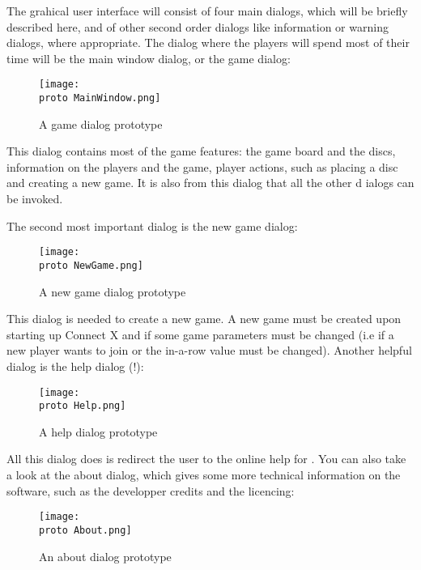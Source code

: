   The  grahical user interface will consist of four main dialogs,
  which will be briefly described here, and of other second order dialogs like
  information or warning dialogs, where appropriate. The dialog where the players
  will spend most of their time will be the main window dialog, or the game
  dialog:

  \begin{figure}[H]
    \texttt{[image: \\proto MainWindow.png]}
    \caption{A game dialog prototype}
  \end{figure}

  This dialog contains most of the game features: the game board and the discs,
  information on the players and the game, player actions, such as placing a
  disc and creating a new game. It is also from this dialog that all the other
  d ialogs can be invoked.

  The second most important dialog is the new game dialog:

  \begin{figure}[H]
    \texttt{[image: \\proto NewGame.png]}
    \caption{A new game dialog prototype}
  \end{figure}

  This dialog is needed to create a new game. A new game must be created upon
  starting up Connect X and if some game parameters must be changed (i.e if
  a new player wants to join or the in-a-row value must be changed). Another
  helpful dialog is the help dialog (!):

  \begin{figure}[H]
    \texttt{[image: \\proto Help.png]}
    \caption{A help dialog prototype}
  \end{figure}

  All this dialog does is redirect the user to the online help for .
  You can also take a look at the about dialog, which gives some more technical
  information on the software, such as the developper credits and the licencing:

  \begin{figure}[H]
    \texttt{[image: \\proto About.png]}
    \caption{An about dialog prototype}
  \end{figure}
